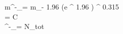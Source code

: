 \ln m^-_\omega = \ln m_\omega - 1.96 \sigma \cdot (e ^ {1.96 \sigma}) ^ {0.315}\\
\sigma =  {\sqrt C}\\
\mu^-_\omega =  {N_{tot}}
